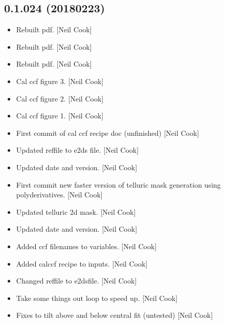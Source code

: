 \documentclass[a4paper,10pt,english]{report}
\begin{document}
\subsection{0.1.024 (2018\sphinxhyphen{}02\sphinxhyphen{}23)}
\label{\detokenize{misc/changelog:id498}}\begin{itemize}
\item {} 
Rebuilt pdf. {[}Neil Cook{]}

\item {} 
Rebuilt pdf. {[}Neil Cook{]}

\item {} 
Rebuilt pdf. {[}Neil Cook{]}

\item {} 
Cal ccf figure 3. {[}Neil Cook{]}

\item {} 
Cal ccf figure 2. {[}Neil Cook{]}

\item {} 
Cal ccf figure 1. {[}Neil Cook{]}

\item {} 
First commit of cal ccf recipe doc (unfinished) {[}Neil Cook{]}

\item {} 
Updated reffile to e2ds file. {[}Neil Cook{]}

\item {} 
Updated date and version. {[}Neil Cook{]}

\item {} 
First commit \sphinxhyphen{} new faster version of telluric mask generation \sphinxhyphen{} using
polyderivatives. {[}Neil Cook{]}

\item {} 
Updated telluric 2d mask. {[}Neil Cook{]}

\item {} 
Updated date and version. {[}Neil Cook{]}

\item {} 
Added ccf filenames to variables. {[}Neil Cook{]}

\item {} 
Added calccf recipe to inputs. {[}Neil Cook{]}

\item {} 
Changed reffile to e2dsfile. {[}Neil Cook{]}

\item {} 
Take some things out loop to speed up. {[}Neil Cook{]}

\item {} 
Fixes to tilt above and below central fit (untested) {[}Neil Cook{]}


\end{itemize}
\end{document}
